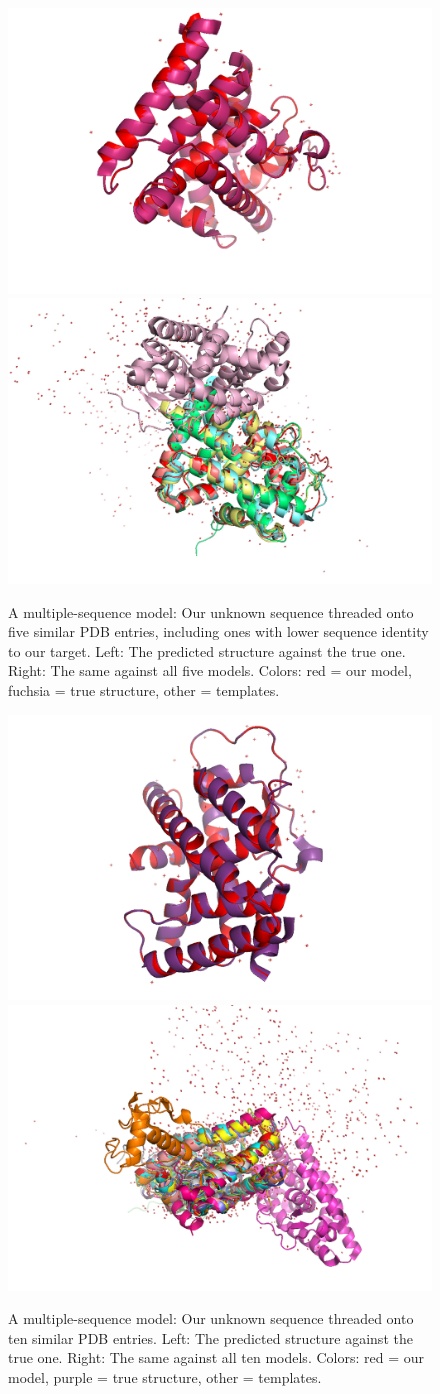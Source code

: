 \documentclass[notitlepage]{report}   %
\begin{document}
\begin{figure}[h!]
 \begin{center}
  \includegraphics[width=0.45\linewidth]{5_templates_truth.png}
  \includegraphics[width=0.45\linewidth]{5_templates.png}
  \caption{A multiple-sequence model: Our unknown sequence threaded onto five similar PDB entries, including ones with lower sequence identity to our target. Left: The predicted structure against the true one. Right: The same against all five models. Colors: red = our model, fuchsia = true structure, other = templates.}
  \label{fig:tt_5}
 \end{center}
\end{figure}

\begin{figure}[h!]
 \begin{center}
  \includegraphics[width=0.45\linewidth]{10_templates_truth.png}
  \includegraphics[width=0.45\linewidth]{10_templates.png}
  \caption{A multiple-sequence model: Our unknown sequence threaded onto ten similar PDB entries. Left: The predicted structure against the true one. Right: The same against all ten models. Colors: red = our model, purple = true structure, other = templates.}
  \label{fig:tt_10}
 \end{center}
\end{figure}
\end{document}
